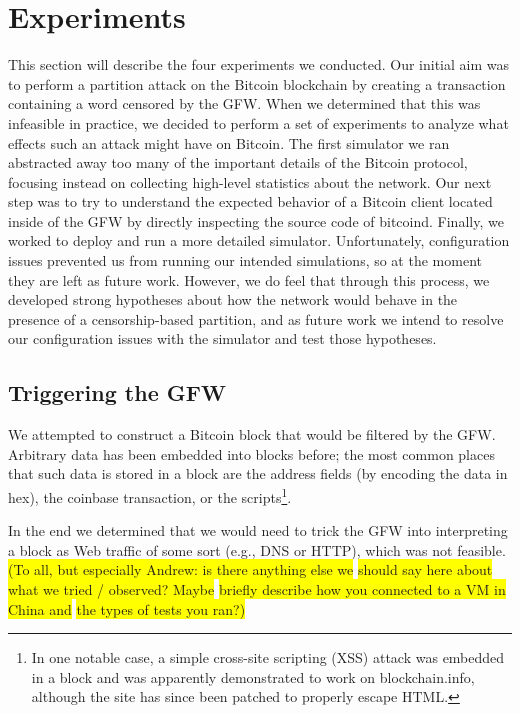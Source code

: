 \section{Experiments}
This section will describe the four experiments we conducted. Our initial aim was to perform a partition attack on the Bitcoin blockchain by creating a transaction containing a word censored by the GFW. When we determined that this was infeasible in practice, we decided to perform a set of experiments to analyze what effects such an attack might have on Bitcoin. The first simulator we ran abstracted away too many of the important details of the Bitcoin protocol, focusing instead on collecting high-level statistics about the network. Our next step was to try to understand the expected behavior of a Bitcoin client located inside of the GFW by directly inspecting the source code of bitcoind. Finally, we worked to deploy and run a more detailed simulator. Unfortunately, configuration issues prevented us from running our intended simulations, so at the moment they are left as future work. However, we do feel that through this process, we developed strong hypotheses about how the network would behave in the presence of a censorship-based partition, and as future work we intend to resolve our configuration issues with the simulator and test those hypotheses.

\subsection{Triggering the GFW}
We attempted to construct a Bitcoin block that would be filtered by the GFW. Arbitrary data has been embedded into blocks before; the most common places that such data is stored in a block are the address fields (by encoding the data in hex), the coinbase transaction, or the scripts\footnote{In one notable case, a simple cross-site scripting (XSS) attack was embedded in a block and was apparently demonstrated to work on blockchain.info\cite{reddit}, although the site has since been patched to properly escape HTML.}. 

In the end we determined that we would need to trick the GFW into interpreting a block as Web traffic of some sort (e.g., DNS or HTTP), which was not feasible.
\colorbox{yellow}{(To all, but especially Andrew: is there anything else we}
\colorbox{yellow}{should say here about what we tried / observed? Maybe}
\colorbox{yellow}{briefly describe how you connected to a VM in China and}
\colorbox{yellow}{the types of tests you ran?)}



